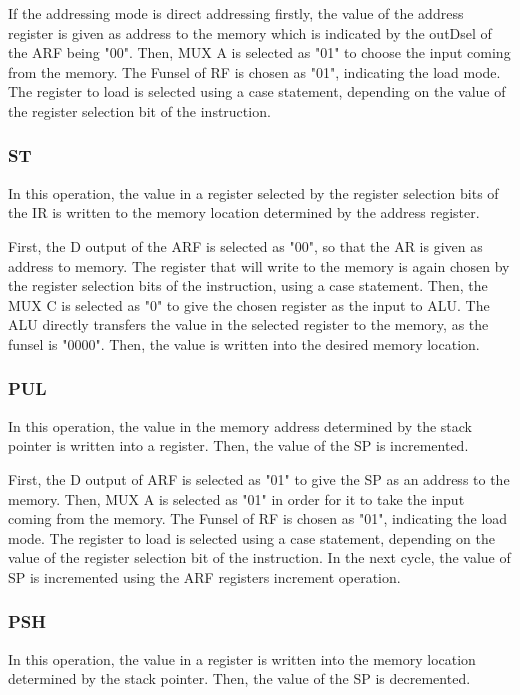 \documentclass[pdftex,12pt,a4paper]{article}
\begin{document}
If the addressing mode is direct addressing firstly, the value of the address register is given as address to the 
memory which is indicated by the outDsel of the ARF being "00". Then, MUX A is selected as "01" to choose the input 
coming from the memory. The Funsel of RF is chosen as "01", indicating the load mode. The register to load is selected 
using a case statement, depending on the value of the register selection bit of the instruction.

\subsubsection{ST}
In this operation, the value in a register selected by the register selection bits of the IR is written to the memory
location determined by the address register. 

First, the D output of the ARF is selected as "00", so that the AR is given as address to memory. The register that 
will write to the memory is again chosen by the register selection bits of the instruction, using a case statement.
Then, the MUX C is selected as "0" to give the chosen register as the input to ALU. The ALU directly transfers the 
value in the selected register to the memory, as the funsel is "0000". Then, the value is written into the desired
memory location.

\subsubsection{PUL}
In this operation, the value in the memory address determined by the stack pointer is written into a register. 
Then, the value of the SP is incremented.

First, the D output of ARF is selected as "01" to give the SP as an address to the memory. Then, MUX A is selected
as "01" in order for it to take the input coming from the memory. The Funsel of RF is chosen as "01", indicating the
load mode. The register to load is selected using a case statement, depending on the value of the register selection
bit of the instruction. In the next cycle, the value of SP is incremented using the ARF registers increment operation.

\subsubsection{PSH}
In this operation, the value in a register is written into the memory location determined by the stack pointer.
Then, the value of the SP is decremented.
\end{document}
